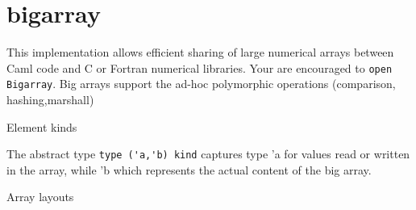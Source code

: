 \section{bigarray}
\label{sec:bigarray}

This implementation allows efficient sharing of large numerical arrays
between Caml code and C or Fortran numerical libraries. Your are
encouraged to \verb|open Bigarray|. Big arrays support the
ad-hoc polymorphic operations (comparison, hashing,marshall)

Element kinds

The abstract type \verb|type ('a,'b) kind| captures type 'a for
values read or written in the array, while 'b which represents the
actual content of the big array.

Array layouts


